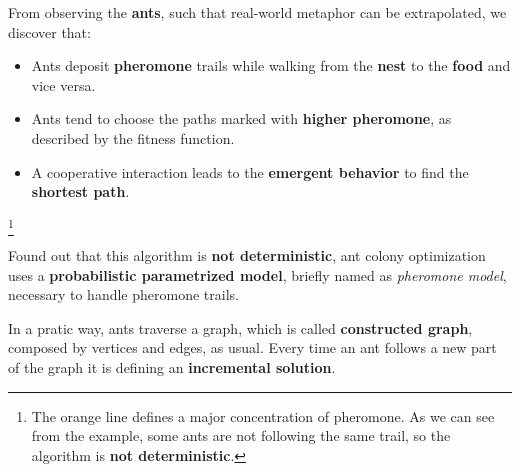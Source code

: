 From observing the \textbf{ants}, such that real-world metaphor can be extrapolated, we discover that:
\begin{itemize}[nosep]
    \renewcommand{\labelitemi}{-}
    \item Ants deposit \textbf{pheromone} trails while walking from the \textbf{nest} to the \textbf{food} and vice versa.
    \item Ants tend to choose the paths marked with \textbf{higher pheromone}, as described by the fitness function.
    \item A cooperative interaction leads to the \textbf{emergent behavior} to find the \textbf{shortest path}.
\end{itemize} \vspace{3.5pt}
\begin{center}
    \footnote{The orange line defines a major concentration of pheromone. As we can see from the example, some ants are not following the same trail, so the algorithm is \textbf{not deterministic}.}
\end{center} \vspace{3.5pt}

Found out that this algorithm is \textbf{not deterministic}, ant colony optimization uses a \textbf{probabilistic parametrized model}, briefly named as \textit{pheromone model},
necessary to handle pheromone trails. \vspace{3.5pt}

In a pratic way, ants traverse a graph, which is called \textbf{constructed graph}, composed by vertices and edges, as usual. Every time an ant follows a new part of the graph
it is defining an \textbf{incremental solution}. \vspace{3.5pt}

